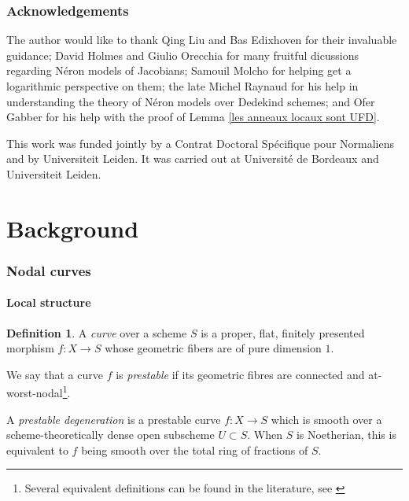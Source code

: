 \documentclass[a4paper,12pt]{amsart} %
\numberwithin{equation}{subsection}
\theoremstyle{definition}
\newtheorem{definition}{Definition}[section]
\theoremstyle{plain}%
\theoremstyle{remark}
\begin{document}
\section*{Acknowledgements}

The author would like to thank Qing Liu and Bas Edixhoven for their invaluable guidance; David Holmes and Giulio Orecchia for many fruitful dicussions regarding Néron models of Jacobians; Samouil Molcho for helping get a logarithmic perspective on them; the late Michel Raynaud for his help in understanding the theory of Néron models over Dedekind schemes; and Ofer Gabber for his help with the proof of Lemma \ref{les anneaux locaux sont UFD}.

This work was funded jointly by a Contrat Doctoral Spécifique pour Normaliens and by Universiteit Leiden. It was carried out at
Universit\'e de Bordeaux and Universiteit Leiden.



\part{Background}\label{part1}

\section{Nodal curves}\label{section_intro1}
 
\subsection{Local structure}

\begin{definition}\label{definition:nodal_curve}
	A \emph{curve} over a scheme $S$ is a proper, flat, finitely presented morphism $f\colon X\to S$ whose geometric fibers are of pure dimension $1$.
	
	We say that a curve $f$ is \emph{prestable} if its geometric fibres are connected and at-worst-nodal\footnote{Several equivalent definitions can be found in the literature, see \cite[\href{https://stacks.math.columbia.edu/tag/0E6S}{Tag 0E6S}]{stacks-project}}.
	
	A \emph{prestable degeneration} is a prestable curve $f\colon X \to S$ which is smooth over a scheme-theoretically dense open subscheme $U\subset S$. When $S$ is Noetherian, this is equivalent to $f$ being smooth over the total ring of fractions of $S$.
\end{definition}
\end{document}
